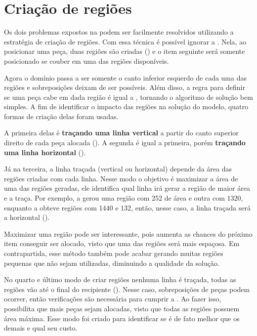 \section{Criação de regiões}\label{sec:criacao-de-regioes}

Os dois problemas expostos na  podem ser facilmente
resolvidos utilizando a estratégia de criação de regiões.
Com essa técnica é possível ignorar a .
Nela, ao posicionar uma peça, duas regiões são criadas () e o item
seguinte será somente posicionado se couber em uma das regiões disponíveis.



Agora o domínio passa a ser somente o canto inferior esquerdo de cada uma das regiões e
sobreposições deixam de ser possíveis.
Além disso, a regra para definir se uma peça cabe em dada região é igual a , tornando
o algoritmo de solução bem simples.
A fim de identificar o impacto das regiões na solução do modelo, quatro formas de criação
delas foram usadas.

A primeira delas é \textbf{traçando uma linha vertical} a partir do canto superior direito de cada
peça alocada ().
A segunda é igual a primeira, porém \textbf{traçando uma linha horizontal} ().



Já na terceira, a linha traçada (vertical ou horizontal) depende da área das regiões criadas
com cada linha.
Nesse modo o objetivo é maximizar a área de uma das regiões geradas, ele identifica qual linha
irá gerar a região de maior área e a traça.
Por exemplo, a  gerou uma região com 252 de área e outra com 1320,
enquanto a  obteve regiões com 1440 e 132, então, nesse caso, a linha
traçada será a horizontal ().



Maximizar uma região pode ser interessante, pois aumenta as chances do próximo item conseguir ser
alocado, visto que uma das regiões será mais espaçosa.
Em contrapartida, esse método também pode acabar gerando muitas regiões pequenas que não sejam
utilizadas, diminuindo a qualidade da solução.

No quarto e último modo de criar regiões nenhuma linha é traçada, todas as regiões vão até o final
do recipiente ().
Nesse caso, sobreposições de peças podem ocorrer, então verificações são necessária para cumprir
a .
Ao fazer isso, possibilita que mais peças sejam alocadas, visto que todas as regiões possuem área
máxima.
Esse modo foi criado para identificar se é de fato melhor que os demais e qual seu custo.

